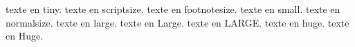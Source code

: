 \documentclass[12pt]{article}
\begin{document}
	{\tiny texte en tiny.} 
	{\scriptsize texte en scriptsize.} 
	{\footnotesize texte en footnotesize.} 
	{\small texte en small.} 
	{\normalsize texte en normalsize.} 
	{\large texte en large.} 
	{\Large texte en Large.} 
	{\LARGE texte en LARGE.} 
	{\huge texte en huge.} 
	{\Huge texte en Huge.} 
\end{document}
